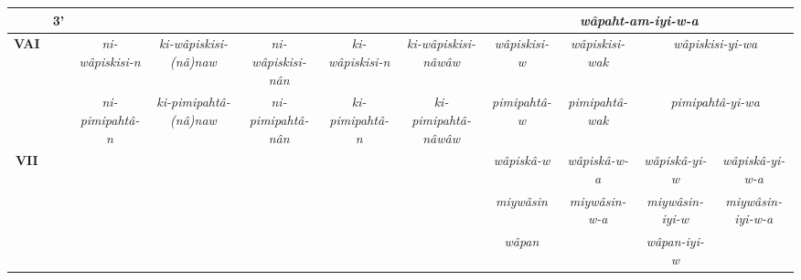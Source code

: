 \documentclass[twoside,a4paper,11pt]{article}
\newcommand{\ipa}[1]{{\phon\textit{#1}}}
\newcommand{\grise}[1]{\cellcolor{lightgray}\textbf{#1}}
\newcommand{\Σ}{\greek{Σ}}
\begin{document}
\begin{landscape}
\begin{table}[H]
{\begin{tabular}{ccccccccccc}
& 3'  &\grise{}  & \grise{}  & \grise{}  &\grise{}  &  \grise{}  &\multicolumn{4}{c}{\ipa{wâpaht-am-iyi-w-a} }\\ 
\bottomrule
\multirow{2}{*}{\textbf{VAI}} &  & \ipa{ni-wâpiskisi-n} & \ipa{ ki-wâpiskisi-(nâ)naw} & \ipa{ni-wâpiskisi-nân} &\ipa{ki-wâpiskisi-n} &\ipa{ ki-wâpiskisi-nâwâw} & \ipa{wâpiskisi-w} & \ipa{wâpiskisi-wak} & \multicolumn{2}{c}{\ipa{wâpiskisi-yi-wa}} \\
&  & \ipa{ni-pimipahtâ-n} & \ipa{ ki-pimipahtâ-(nâ)naw} & \ipa{ni-pimipahtâ-nân} &\ipa{ki-pimipahtâ-n} &\ipa{ ki-pimipahtâ-nâwâw} & \ipa{pimipahtâ-w} & \ipa{pimipahtâ-wak} & \multicolumn{2}{c}{\ipa{pimipahtâ-yi-wa}} \\
\bottomrule
\multirow{2}{*}{\textbf{VII}} &  &  \grise{}  &  \grise{}  &  \grise{} & \grise{}  & \grise{}  & \ipa{wâpiskâ-w} & \ipa{wâpiskâ-w-a} & \ipa{wâpiskâ-yi-w} & \ipa{wâpiskâ-yi-w-a}\\
  & &  \grise{}  &  \grise{}  &  \grise{} & \grise{}  & \grise{}  & \ipa{miywâsin} & \ipa{miywâsin-w-a} & \ipa{miywâsin-iyi-w} & \ipa{miywâsin-iyi-w-a}\\
 & &  \grise{}  &  \grise{}  &  \grise{} & \grise{}  & \grise{}  & \ipa{wâpan} &\grise{} & \ipa{wâpan-iyi-w} & \grise{}\\
\bottomrule
\end{tabular}}
\end{table}


\end{landscape}
\end{document}
